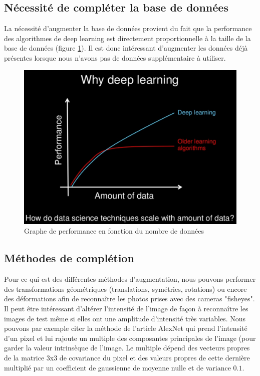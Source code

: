 \documentclass[a4paper,11pt]{article}
\begin{document}
    \subsection{Nécessité de compléter la base de données}

	La nécessité d'augmenter la base de données provient du fait que la performance des
	algorithmes de deep learning est directement proportionnelle à la taille de la base de
	données (figure \ref{fig:data1}). Il est donc intéressant d'augmenter les données déjà présentes
	lorsque nous n'avons pas de données supplémentaire à utiliser.

	\begin{figure}[H]
	    \centering
	    \includegraphics[scale=0.3]{deeplearning_data.png}
	    \caption{Graphe de performance en fonction du nombre de données}
	    \label{fig:data1}
	\end{figure}

    \subsection{Méthodes de complétion}

	Pour ce qui est des différentes méthodes d'augmentation, nous pouvons performer des
	transformations géométriques (translations, symétries, rotations) ou encore des
	déformations afin de reconnaître les photos prises avec des cameras "fisheyes".\\

	Il peut être intéressant d'altérer l'intensité de l'image de façon à reconnaître les images
	de test même si elles ont une amplitude d'intensité très variables. Nous pouvons par exemple
	citer la méthode de l'article AlexNet \cite{alexnet} qui prend l'intensité d'un pixel et lui
	rajoute un multiple des composantes principales de l'image (pour garder la valeur
	intrinsèque de l'image. Le multiple dépend des vecteurs propres de la matrice 3x3 de
	covariance du pixel et des valeurs propres de cette dernière multiplié par un coefficient
	de gaussienne de moyenne nulle et de variance $0.1$.\\
\end{document}
